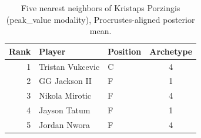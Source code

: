 \begin{table}[htbp]
  \centering\small
  \begin{tabular}{rllc}
    \toprule
    Rank & Player & Position & Archetype \\
    \midrule
    1 & Tristan Vukcevic & C & 4 \\
    2 & GG Jackson II & F & 1 \\
    3 & Nikola Mirotic & F & 4 \\
    4 & Jayson Tatum & F & 1 \\
    5 & Jordan Nwora & F & 4 \\
    \bottomrule
  \end{tabular}
  \caption{Five nearest neighbors of Kristaps Porzingis (peak_value modality), Procrustes-aligned posterior mean.}
  \label{tab:Kristaps_Porzingis_neighbors_peak_value}
\end{table}

